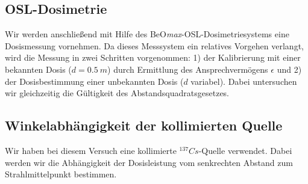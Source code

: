 \subsection{OSL-Dosimetrie}
Wir werden anschließend mit Hilfe des BeO\textit{max}-OSL-Dosimetriesystems eine Dosismessung vornehmen. Da dieses Messsystem ein relatives Vorgehen verlangt, wird die Messung in zwei Schritten vorgenommen: 1) der Kalibrierung mit einer bekannten Dosis ($d=0.5\ m$) durch Ermittlung des Ansprechvermögens $\epsilon$ und 2) der Dosisbestimmung einer unbekannten Dosis ($d$ variabel). Dabei untersuchen wir gleichzeitig die Gültigkeit des Abstandsquadratsgesetzes.

\subsection{Winkelabhängigkeit der kollimierten Quelle}
Wir haben bei diesem Versuch eine kollimierte $^{137}Cs$-Quelle verwendet. Dabei werden wir die Abhängigkeit der Dosisleistung vom senkrechten Abstand zum Strahlmittelpunkt bestimmen.